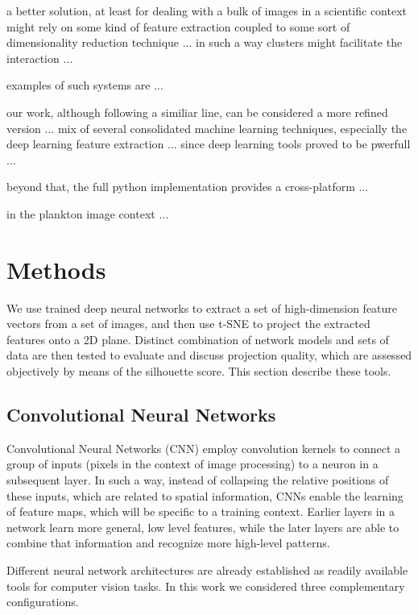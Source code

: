 \documentclass[sn-basic]{sn-jnl}%
\theoremstyle{thmstyleone}%
\theoremstyle{thmstyletwo}%
\theoremstyle{thmstylethree}%
\begin{document}
a better solution, at least for dealing with a bulk of images in a scientific context might rely on some kind of feature extraction coupled to some sort of dimensionality reduction technique ... in such a way clusters might facilitate the interaction ...

examples of such systems are ...

our work, although following a similiar line, can be considered a more refined version ... mix of several consolidated machine learning techniques, especially the deep learning feature extraction ... since deep learning tools proved to be pwerfull ...

beyond that, the full python implementation provides a cross-platform ...

in the plankton image context ...






\section{Methods}

We use trained deep neural networks to extract a set of high-dimension feature vectors from a set of images, and then use t-SNE to project the extracted features onto a 2D plane. Distinct combination of network models and sets of data are then tested to evaluate and discuss projection quality, which are assessed objectively by means of the silhouette score. This section describe these tools.


\subsection{Convolutional Neural Networks}

Convolutional Neural Networks (CNN) employ convolution kernels to connect a group of inputs (pixels in the context of image processing) to a neuron in a subsequent layer. In such a way, instead of collapsing the relative positions of these inputs, which are related to spatial information, CNNs enable the learning of feature maps, which will be specific to a training context. Earlier layers in a network learn more general, low level features, while the later layers are able to combine that information and recognize more high-level patterns.

Different neural network architectures are already established as readily available tools for computer vision tasks. In this work we considered three complementary configurations.
\end{document}
